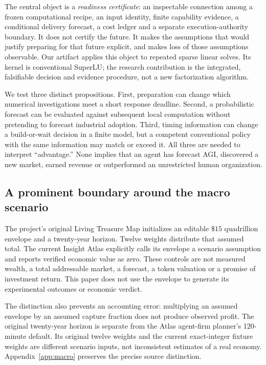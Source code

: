 \documentclass[11pt,a4paper]{article}
\begin{document}
The central object is a \emph{readiness certificate}: an inspectable connection among a frozen computational recipe, an input identity, finite capability evidence, a conditional delivery forecast, a cost ledger and a separate execution-authority boundary. It does not certify the future. It makes the assumptions that would justify preparing for that future explicit, and makes loss of those assumptions observable. Our artifact applies this object to repeated sparse linear solves. Its kernel is conventional SuperLU; the research contribution is the integrated, falsifiable decision and evidence procedure, not a new factorization algorithm.

We test three distinct propositions. First, preparation can change which numerical investigations meet a short response deadline. Second, a probabilistic forecast can be evaluated against subsequent local computation without pretending to forecast industrial adoption. Third, timing information can change a build-or-wait decision in a finite model, but a competent conventional policy with the same information may match or exceed it. All three are needed to interpret ``advantage.'' None implies that an agent has forecast AGI, discovered a new market, earned revenue or outperformed an unrestricted human organization.

\subsection{A prominent boundary around the macro scenario}
\begin{claimbox}[title={\sffamily Assumption panel: the $\$15$ quadrillion envelope}]
The project's original Living Treasure Map initializes an editable $\$15$ quadrillion envelope and a twenty-year horizon. Twelve weights distribute that assumed total. The current Insight Atlas explicitly calls its envelope a scenario assumption and reports verified economic value as zero. These controls are not measured wealth, a total addressable market, a forecast, a token valuation or a promise of investment return. This paper does not use the envelope to generate its experimental outcomes or economic verdict. \citep{atlas2026,treasure2026}
\end{claimbox}

The distinction also prevents an accounting error: multiplying an assumed envelope by an assumed capture fraction does not produce observed profit. The original twenty-year horizon is separate from the Atlas agent-firm planner's 120-minute default. Its original twelve weights and the current exact-integer fixture weights are different scenario inputs, not inconsistent estimates of a real economy. Appendix~\ref{app:macro} preserves the precise source distinction.
\end{document}
